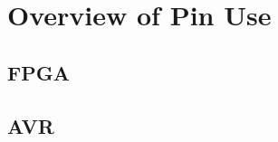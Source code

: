 \section{Overview of Pin Use}\label{app:pin-use}

\subsection{FPGA}\label{app:pin-use-fpga}

\subsection{AVR}\label{app:pin-use-avr}

